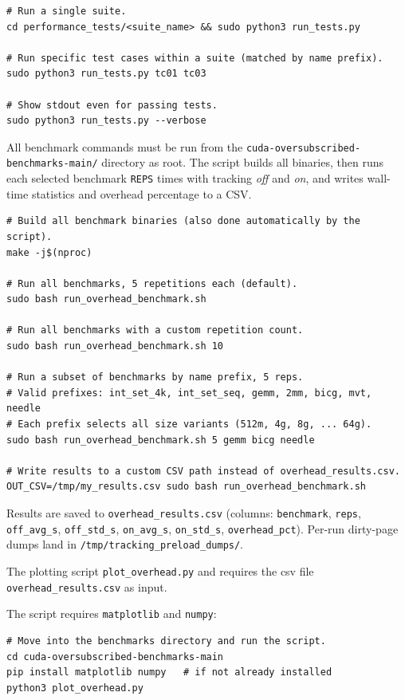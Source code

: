 \begin{lstlisting}
# Run a single suite.
cd performance_tests/<suite_name> && sudo python3 run_tests.py

# Run specific test cases within a suite (matched by name prefix).
sudo python3 run_tests.py tc01 tc03

# Show stdout even for passing tests.
sudo python3 run_tests.py --verbose
\end{lstlisting}


All benchmark commands must be run from the
\texttt{cuda-oversubscribed-benchmarks-main/} directory as root.
The script builds all binaries, then runs each selected benchmark
\texttt{REPS} times with tracking \emph{off} and \emph{on}, and writes
wall-time statistics and overhead percentage to a CSV.

\begin{lstlisting}
# Build all benchmark binaries (also done automatically by the script).
make -j$(nproc)

# Run all benchmarks, 5 repetitions each (default).
sudo bash run_overhead_benchmark.sh

# Run all benchmarks with a custom repetition count.
sudo bash run_overhead_benchmark.sh 10

# Run a subset of benchmarks by name prefix, 5 reps.
# Valid prefixes: int_set_4k, int_set_seq, gemm, 2mm, bicg, mvt, needle
# Each prefix selects all size variants (512m, 4g, 8g, ... 64g).
sudo bash run_overhead_benchmark.sh 5 gemm bicg needle

# Write results to a custom CSV path instead of overhead_results.csv.
OUT_CSV=/tmp/my_results.csv sudo bash run_overhead_benchmark.sh
\end{lstlisting}

Results are saved to \texttt{overhead\_results.csv} (columns:
\texttt{benchmark}, \texttt{reps}, \texttt{off\_avg\_s}, \texttt{off\_std\_s},
\texttt{on\_avg\_s}, \texttt{on\_std\_s}, \texttt{overhead\_pct}).
Per-run dirty-page dumps land in \texttt{/tmp/tracking\_preload\_dumps/}.


The plotting script \texttt{plot\_overhead.py} and requires the csv file
\texttt{overhead\_results.csv} as input.

The script requires \texttt{matplotlib} and \texttt{numpy}:

\begin{lstlisting}
# Move into the benchmarks directory and run the script.
cd cuda-oversubscribed-benchmarks-main
pip install matplotlib numpy   # if not already installed
python3 plot_overhead.py
\end{lstlisting}

